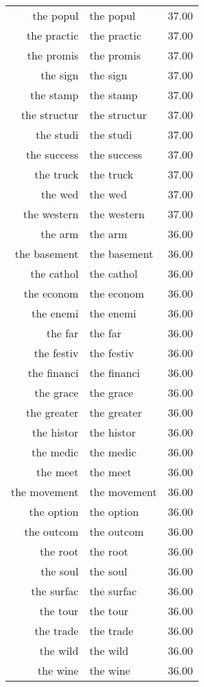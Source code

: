 \begin{table}[ht]
\begin{tabular}{rlr}
  the popul & the popul & 37.00 \\ 
  the practic & the practic & 37.00 \\ 
  the promis & the promis & 37.00 \\ 
  the sign & the sign & 37.00 \\ 
  the stamp & the stamp & 37.00 \\ 
  the structur & the structur & 37.00 \\ 
  the studi & the studi & 37.00 \\ 
  the success & the success & 37.00 \\ 
  the truck & the truck & 37.00 \\ 
  the wed & the wed & 37.00 \\ 
  the western & the western & 37.00 \\ 
  the arm & the arm & 36.00 \\ 
  the basement & the basement & 36.00 \\ 
  the cathol & the cathol & 36.00 \\ 
  the econom & the econom & 36.00 \\ 
  the enemi & the enemi & 36.00 \\ 
  the far & the far & 36.00 \\ 
  the festiv & the festiv & 36.00 \\ 
  the financi & the financi & 36.00 \\ 
  the grace & the grace & 36.00 \\ 
  the greater & the greater & 36.00 \\ 
  the histor & the histor & 36.00 \\ 
  the medic & the medic & 36.00 \\ 
  the meet & the meet & 36.00 \\ 
  the movement & the movement & 36.00 \\ 
  the option & the option & 36.00 \\ 
  the outcom & the outcom & 36.00 \\ 
  the root & the root & 36.00 \\ 
  the soul & the soul & 36.00 \\ 
  the surfac & the surfac & 36.00 \\ 
  the tour & the tour & 36.00 \\ 
  the trade & the trade & 36.00 \\ 
  the wild & the wild & 36.00 \\ 
  the wine & the wine & 36.00 \\ 

\end{tabular}
\end{table}
